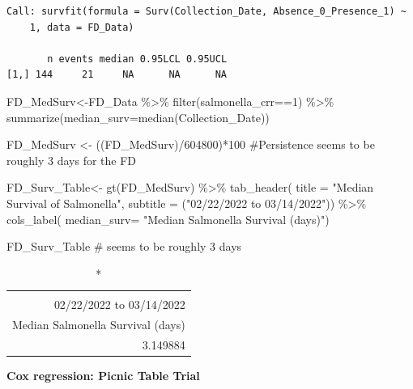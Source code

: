 \documentclass[
  letterpaper,
  DIV=11,
  numbers=noendperiod]{scrartcl}
\newenvironment{Shaded}{}{}
\newcommand{\AttributeTok}[1]{\textcolor[rgb]{0.84,0.23,0.29}{#1}}
\newcommand{\CommentTok}[1]{\textcolor[rgb]{0.42,0.45,0.49}{#1}}
\newcommand{\DecValTok}[1]{\textcolor[rgb]{0.00,0.36,0.77}{#1}}
\newcommand{\FunctionTok}[1]{\textcolor[rgb]{0.44,0.26,0.76}{#1}}
\newcommand{\NormalTok}[1]{\textcolor[rgb]{0.14,0.16,0.18}{#1}}
\newcommand{\OtherTok}[1]{\textcolor[rgb]{0.44,0.26,0.76}{#1}}
\newcommand{\SpecialCharTok}[1]{\textcolor[rgb]{0.00,0.36,0.77}{#1}}
\newcommand{\StringTok}[1]{\textcolor[rgb]{0.01,0.18,0.38}{#1}}
\begin{document}
\begin{verbatim}
Call: survfit(formula = Surv(Collection_Date, Absence_0_Presence_1) ~ 
    1, data = FD_Data)

       n events median 0.95LCL 0.95UCL
[1,] 144     21     NA      NA      NA
\end{verbatim}

\begin{Shaded}
\begin{Highlighting}[]
\NormalTok{FD\_MedSurv}\OtherTok{\textless{}{-}}\NormalTok{FD\_Data }\SpecialCharTok{\%\textgreater{}\%}
 \FunctionTok{filter}\NormalTok{(salmonella\_crr}\SpecialCharTok{==}\DecValTok{1}\NormalTok{) }\SpecialCharTok{\%\textgreater{}\%}
  \FunctionTok{summarize}\NormalTok{(}\AttributeTok{median\_surv=}\FunctionTok{median}\NormalTok{(Collection\_Date))}

\NormalTok{FD\_MedSurv }\OtherTok{\textless{}{-}}\NormalTok{ ((FD\_MedSurv)}\SpecialCharTok{/}\DecValTok{604800}\NormalTok{)}\SpecialCharTok{*}\DecValTok{100} \CommentTok{\#Persistence seems to be roughly 3 days for the FD}

\NormalTok{FD\_Surv\_Table}\OtherTok{\textless{}{-}} \FunctionTok{gt}\NormalTok{(FD\_MedSurv) }\SpecialCharTok{\%\textgreater{}\%}
   \FunctionTok{tab\_header}\NormalTok{(}
    \AttributeTok{title =} \StringTok{"Median Survival of Salmonella"}\NormalTok{,}
    \AttributeTok{subtitle =}\NormalTok{ (}\StringTok{"02/22/2022 to 03/14/2022"}\NormalTok{)) }\SpecialCharTok{\%\textgreater{}\%}
  \FunctionTok{cols\_label}\NormalTok{(}
    \AttributeTok{median\_surv=} \StringTok{"Median Salmonella Survival (days)"}\NormalTok{) }

\NormalTok{FD\_Surv\_Table }\CommentTok{\# seems to be roughly 3 days}
\end{Highlighting}
\end{Shaded}

\begin{longtable}{r}
\caption*{
{\large Median Survival of Salmonella} \\ 
{\small 02/22/2022 to 03/14/2022}
} \\ 
\toprule
Median Salmonella Survival (days) \\ 
\midrule
3.149884 \\ 
\bottomrule
\end{longtable}

\textbf{Cox regression: Picnic Table Trial}

\begin{Shaded}
\end{Shaded}
\end{document}
